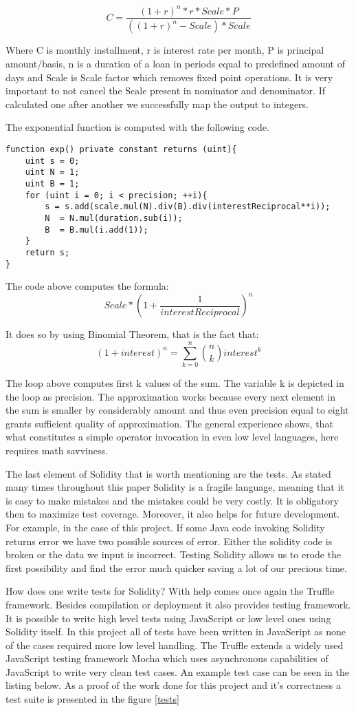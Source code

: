 \documentclass[a4paper,12pt,twoside,openany]{report}
\begin{document}
\[C = \frac{(1+r)^n * r * Scale * P}{((1+r)^n - Scale) * Scale}	\]

Where C is monthly installment, r is interest rate per month, P is principal amount/basis, n is a duration of a loan in periods equal to predefined amount of days and Scale is Scale factor which removes fixed point operations. It is very important to not cancel the Scale present in nominator and denominator. If calculated one after another we successfully map the output to integers.

The exponential function is computed with the following code.
\begin{lstlisting}
function exp() private constant returns (uint){
	uint s = 0;
	uint N = 1;
	uint B = 1;
	for (uint i = 0; i < precision; ++i){
		s = s.add(scale.mul(N).div(B).div(interestReciprocal**i));
	    N  = N.mul(duration.sub(i));
	    B  = B.mul(i.add(1));
	}
	return s;
}
\end{lstlisting}

The code above computes the formula:
\[	Scale * (1 + \frac{1}{interestReciprocal})^n \]

It does so by using Binomial Theorem, that is the fact that:
\[	(1 + interest)^n = \sum_{k=0}^n {n \choose k} interest^k \]

The loop above computes first k values of the sum. The variable k is depicted in the loop as precision. The approximation works because every next element in the sum is smaller by considerably amount and thus even precision equal to eight grants sufficient quality of approximation. The general experience shows, that what constitutes a simple operator invocation in even low level languages, here requires math savviness.

The last element of Solidity that is worth mentioning are the tests. As stated many times throughout this paper Solidity is a fragile language, meaning that it is easy to make mistakes and the mistakes could be very costly. It is obligatory then to maximize test coverage. Moreover, it also helps for future development. For example, in the case of this project. If some Java code invoking Solidity returns error we have two possible sources of error. Either the solidity code is broken or the data we input is incorrect. Testing Solidity allows us to erode the first possibility and find the error much quicker saving a lot of our precious time. 

How does one write tests for Solidity? With help comes once again the Truffle framework. Besides compilation or deployment it also provides testing framework. It is possible to write high level tests using JavaScript or low level ones using Solidity itself. In this project all of tests have been written in JavaScript as none of the cases required more low level handling. The Truffle extends a widely used JavaScript testing framework Mocha which uses asynchronous capabilities of JavaScript to write very clean test cases. An example test case can be seen in the listing below. As a proof of the work done for this project and it's correctness a test suite is presented in the figure \ref{tests}
\end{document}

